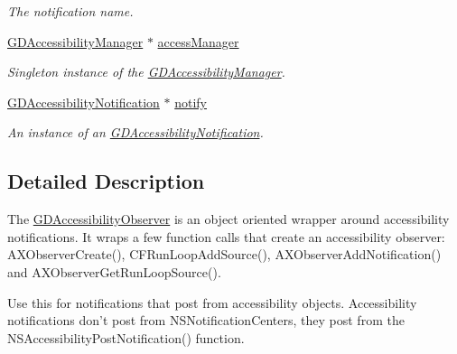 \begin{DoxyCompactItemize}
\begin{DoxyCompactList}\small\item\em The notification name. \item\end{DoxyCompactList}\item 
\hypertarget{interface_g_d_accessibility_observer_a719a5c28d6ad27bbcab4b864868291fa}{
\hyperlink{interface_g_d_accessibility_manager}{GDAccessibilityManager} $\ast$ \hyperlink{interface_g_d_accessibility_observer_a719a5c28d6ad27bbcab4b864868291fa}{accessManager}}
\label{interface_g_d_accessibility_observer_a719a5c28d6ad27bbcab4b864868291fa}

\begin{DoxyCompactList}\small\item\em Singleton instance of the \hyperlink{interface_g_d_accessibility_manager}{GDAccessibilityManager}. \item\end{DoxyCompactList}\item 
\hypertarget{interface_g_d_accessibility_observer_ac10d3d1ce12d457cf53ac6bb3d86c380}{
\hyperlink{interface_g_d_accessibility_notification}{GDAccessibilityNotification} $\ast$ \hyperlink{interface_g_d_accessibility_observer_ac10d3d1ce12d457cf53ac6bb3d86c380}{notify}}
\label{interface_g_d_accessibility_observer_ac10d3d1ce12d457cf53ac6bb3d86c380}

\begin{DoxyCompactList}\small\item\em An instance of an \hyperlink{interface_g_d_accessibility_notification}{GDAccessibilityNotification}. \item\end{DoxyCompactList}\end{DoxyCompactItemize}


\subsection{Detailed Description}
The \hyperlink{interface_g_d_accessibility_observer}{GDAccessibilityObserver} is an object oriented wrapper around accessibility notifications. It wraps a few function calls that create an accessibility observer: AXObserverCreate(), CFRunLoopAddSource(), AXObserverAddNotification() and AXObserverGetRunLoopSource().

Use this for notifications that post from accessibility objects. Accessibility notifications don't post from NSNotificationCenters, they post from the NSAccessibilityPostNotification() function.

